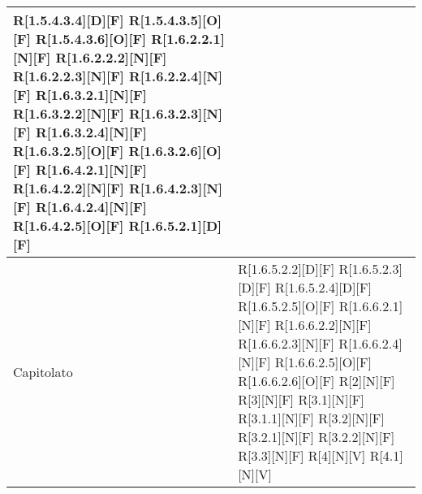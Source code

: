 \begin{longtable}{X | X}
R[1.5.4.3.4][D][F] \newline
R[1.5.4.3.5][O][F] \newline
R[1.5.4.3.6][O][F] \newline
R[1.6.2.2.1][N][F] \newline
R[1.6.2.2.2][N][F] \newline
R[1.6.2.2.3][N][F] \newline
R[1.6.2.2.4][N][F] \newline
R[1.6.3.2.1][N][F] \newline
R[1.6.3.2.2][N][F] \newline
R[1.6.3.2.3][N][F] \newline
R[1.6.3.2.4][N][F] \newline
R[1.6.3.2.5][O][F] \newline
R[1.6.3.2.6][O][F] \newline
R[1.6.4.2.1][N][F] \newline
R[1.6.4.2.2][N][F] \newline
R[1.6.4.2.3][N][F] \newline
R[1.6.4.2.4][N][F] \newline
R[1.6.4.2.5][O][F] \newline
R[1.6.5.2.1][D][F] \newline \\
\hline 
Capitolato &
R[1.6.5.2.2][D][F] \newline
R[1.6.5.2.3][D][F] \newline
R[1.6.5.2.4][D][F] \newline
R[1.6.5.2.5][O][F] \newline
R[1.6.6.2.1][N][F] \newline
R[1.6.6.2.2][N][F] \newline
R[1.6.6.2.3][N][F] \newline
R[1.6.6.2.4][N][F] \newline
R[1.6.6.2.5][O][F] \newline
R[1.6.6.2.6][O][F] \newline
R[2][N][F] \newline
R[3][N][F] \newline
R[3.1][N][F] \newline
R[3.1.1][N][F] \newline
R[3.2][N][F] \newline
R[3.2.1][N][F] \newline
R[3.2.2][N][F] \newline
R[3.3][N][F] \newline
R[4][N][V] \newline
R[4.1][N][V] \newline

\end{longtable}

